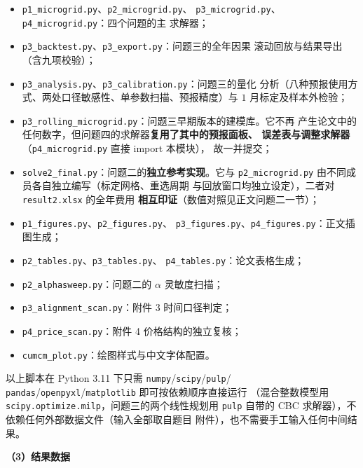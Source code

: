 \documentclass[withoutpreface,bwprint]{cumcmthesis}
\begin{document}
\begin{appendices}
\begin{itemize}
  \item \texttt{p1\_microgrid.py}、\texttt{p2\_microgrid.py}、
        \texttt{p3\_microgrid.py}、\texttt{p4\_microgrid.py}：四个问题的主
        求解器；
  \item \texttt{p3\_backtest.py}、\texttt{p3\_export.py}：问题三的全年因果
        滚动回放与结果导出（含九项校验）；
  \item \texttt{p3\_analysis.py}、\texttt{p3\_calibration.py}：问题三的量化
        分析（八种预报使用方式、两处口径敏感性、单参数扫描、预报精度）与
        $1$ 月标定及样本外检验；
  \item \texttt{p3\_rolling\_microgrid.py}：问题三早期版本的建模库。它不再
        产生论文中的任何数字，但问题四的求解器\textbf{复用了其中的预报面板、
        误差表与调整求解器}（\texttt{p4\_microgrid.py} 直接 import 本模块），
        故一并提交；
  \item \texttt{solve2\_final.py}：问题二的\textbf{独立参考实现}。它与
        \texttt{p2\_microgrid.py} 由不同成员各自独立编写（标定网格、重选周期
        与回放窗口均独立设定），二者对 \texttt{result2.xlsx} 的全年费用
        \textbf{相互印证}（数值对照见正文问题二一节）；
  \item \texttt{p1\_figures.py}、\texttt{p2\_figures.py}、
        \texttt{p3\_figures.py}、\texttt{p4\_figures.py}：正文插图生成；
  \item \texttt{p2\_tables.py}、\texttt{p3\_tables.py}、
        \texttt{p4\_tables.py}：论文表格生成；
  \item \texttt{p2\_alphasweep.py}：问题二的 $\alpha$ 灵敏度扫描；
  \item \texttt{p3\_alignment\_scan.py}：附件 3 时间口径判定；
  \item \texttt{p4\_price\_scan.py}：附件 4 价格结构的独立复核；
  \item \texttt{cumcm\_plot.py}：绘图样式与中文字体配置。
\end{itemize}

以上脚本在 Python 3.11 下只需 \texttt{numpy}/\texttt{scipy}/\texttt{pulp}/
\texttt{pandas}/\texttt{openpyxl}/\texttt{matplotlib} 即可按依赖顺序直接运行
（混合整数模型用 \texttt{scipy.optimize.milp}，问题三的两个线性规划用
\texttt{pulp} 自带的 CBC 求解器），不依赖任何外部数据文件（输入全部取自题目
附件），也不需要手工输入任何中间结果。

\textbf{（3）结果数据}


\end{appendices}
\end{document}
